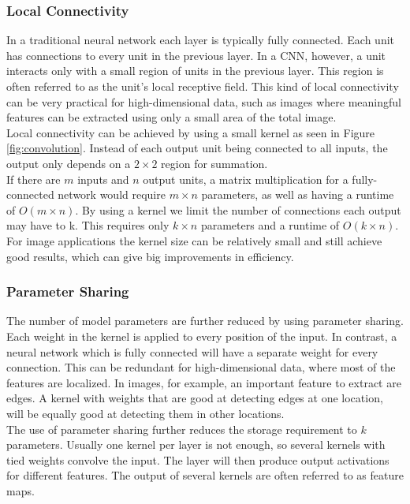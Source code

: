 \subsubsection{Local Connectivity}
In a traditional neural network each layer is typically fully connected. Each unit has connections to every unit in the previous layer. In a \ac{CNN}, however, a unit  interacts only with a small region of units in the previous layer. This region is often referred to as the unit's local receptive field. This kind of local connectivity can be very practical for high-dimensional data, such as images where meaningful features can be extracted using only a small area of the total image. \\

Local connectivity can be achieved by using a small kernel as seen in Figure \ref{fig:convolution}. Instead of each output unit being connected to all inputs, the output only depends on a $2 \times 2$ region for summation. \\

If there are $m$ inputs and $n$ output units, a matrix multiplication for a fully-connected network would require $m\times n$ parameters, as well as having a runtime of $O(m\times n)$. By using a kernel we limit the number of connections each output may have to k. This requires only $k\times n$ parameters and a runtime of $O(k\times n)$. For image applications the kernel size can be relatively small and still achieve good results, which can give big improvements in efficiency.

\subsubsection{Parameter Sharing}
The number of model parameters are further reduced by using parameter sharing. Each weight in the kernel is applied to every position of the input. In contrast, a neural network which is fully connected will have a separate weight for every connection. This can be redundant for high-dimensional data, where most of the features are localized. In images, for example, an important feature to extract are edges. A kernel with weights that are good at detecting edges at one location, will be equally good at detecting them in other locations. \\

The use of parameter sharing further reduces the storage requirement to $k$ parameters. Usually one kernel per layer is not enough, so several kernels with tied weights convolve the input. The layer will then produce output activations for different features. The output of several kernels are often referred to as feature maps.

